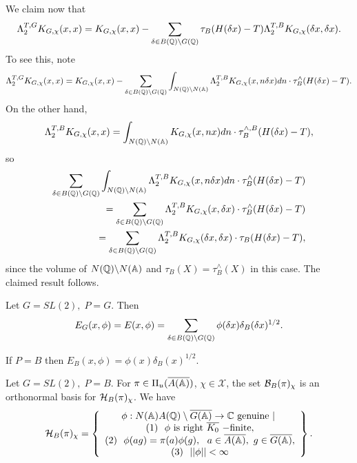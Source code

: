 \begin{example}
We claim now that 
\begin{equation}
\Lambda _2^{T,G}K_{G,\chi }(x,x)=K_{G,\chi }(x,x)-\sum_{\delta \in B(\qqq %
)\backslash G(\qqq )}\tau _B(H(\delta x)-T)\Lambda _2^{T,B}K_{G,\chi
}(\delta x,\delta x).
\end{equation}
To see this, note 
\[
\Lambda _2^{T,G}K_{G,\chi }(x,x)=K_{G,\chi }(x,x)-\sum_{\delta \in B(\qqq %
)\backslash G(\qqq )}\int_{N(\qqq )\backslash N(\aaa )}\Lambda
_2^{T,B}K_{G,\chi }(x,n\delta x)dn\cdot \tau _B^{\wedge }(H(\delta x)-T).
\]
On the other hand, 
\[
\Lambda _2^{T,B}K_{G,\chi }(x,x)=\int_{N(\qqq )\backslash N(\aaa %
)}K_{G,\chi }(x,nx)dn\cdot \tau _B^{\wedge ,B}(H(\delta x)-T),
\]
so 
\begin{eqnarray}
\sum_{\delta \in B(\mathbb{Q} )\backslash G(\mathbb{Q} )}\int_{N(\mathbb{Q} )\backslash
N(\mathbb{A} )}\Lambda _2^{T,B}K_{G,\chi }(x,n\delta x)dn\cdot \tau _B^{\wedge
}(H(\delta x)-T)  \nonumber \\
=\sum_{\delta \in B(\mathbb{Q} )\backslash G(\mathbb{Q} )}\Lambda _2^{T,B}K_{G,\chi
}(x,\delta x)\cdot \tau _B^{\wedge }(H(\delta x)-T)  \nonumber \\
=\sum_{\delta \in B(\mathbb{Q} )\backslash G(\mathbb{Q} )}\Lambda _2^{T,B}K_{G,\chi
}(\delta x,\delta x)\cdot \tau _B(H(\delta x)-T),
\end{eqnarray}
since the volume of $N(\mathbb{Q} )\backslash N(\mathbb{A} )$ and $\tau _B(X)=\tau
_B^{\wedge }(X)$ in this case. The claimed result follows.
\end{example}

\begin{example}
Let $G=SL(2),\;P=G$. Then 
\[
E_G(x,\phi )=E(x,\phi )=\sum_{\delta \in B(\qqq )\backslash G(\qqq %
)}\phi (\delta x)\delta _B(\delta x)^{1/2}.
\]

If $P=B$ then $E_B(x,\phi )=\phi (x)\delta _B(x)^{1/2}$.
\end{example}

\begin{example}
Let $G=SL(2),\;P=B$. For $\pi \in \Pi _u(\overline{A(\mathbb{A} )})$,
$\chi \in \mathcal{X}$,
the set ${\cal{B}}_B(\pi )_\chi $ is an orthonormal basis for
${\cal{H}}_B(\pi )_\chi $. We have 
\[
{\cal{H}}_B(\pi )_\chi =\left\{
\begin{array}{c}
\phi:N(\mathbb{A} )A(\mathbb{Q} )\setminus \overline{G(\mathbb{A} )}\rightarrow
{\Bbb C}\ {\rm genuine\ }|\ \\
(1)\ \  \phi {\rm\ is\  right}\  \overline{K_0}\ {\rm -finite},\\
(2) \ \ \phi(ag)=\pi(a)\phi(g),
\ \ a\in \overline{A(\mathbb{A} )},\ g\in \overline{G(\mathbb{A} )},\\
(3)\ \  ||\phi ||<\infty
\end{array}
\right\}.
\]
\end{example}

